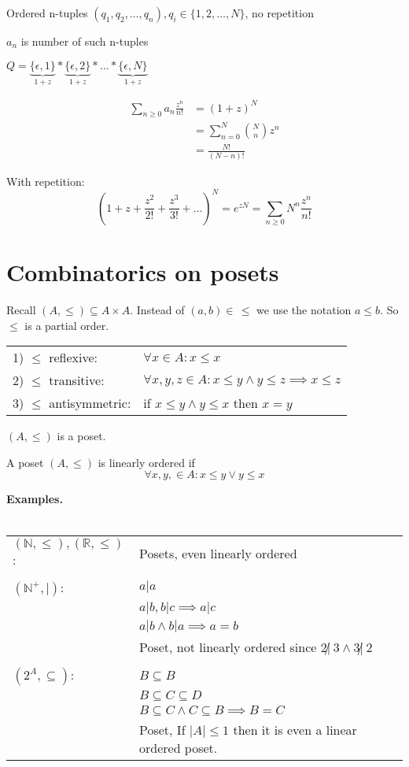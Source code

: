 Ordered n-tuples $(q_1,q_2, \ldots, q_n), q_i \in \{1,2, \ldots, N\}$, no repetition

$a_n$ is number of such n-tuples

$Q = \underbrace{\{\epsilon,1\}}_{1+z} *
     \underbrace{\{\epsilon,2\}}_{1+z} * \ldots *
     \underbrace{\{\epsilon,N\}}_{1+z} $

\begin{align*}
  \sum_{n\geq 0} a_n \frac{z^n}{n!} &=
    (1+z)^N \\
    &= \sum_{n=0} ^{N} {N \choose n} z^n \\
    &= \frac{N!}{(N-n)!}
\end{align*}

With repetition:
\[
  (1+z+ \frac{z^2}{2!} + \frac{z^3}{3!} + \ldots)^N
    = e^{zN} = \sum_{n\geq 0} N^n \frac{z^n}{n!}
\]

\section{Combinatorics on posets}

Recall $(A, \leq) \subseteq A \times A$.
Instead of $(a,b) \in \, \leq$ we use the notation $a \leq b$. So $\leq$ is a partial order.

\begin{tabular}{ll}
  1) $\leq$ reflexive: &
    $\forall x \in A: x \leq x$ \\
  2) $\leq$ transitive:  &
    $\forall x,y,z \in A: x \leq y \land y \leq z \implies x \leq z$ \\
  3) $\leq$ antisymmetric: &
    if $x \leq y \land y \leq x$ then $x = y$ \\
\end{tabular}

$(A,\leq)$ is a poset.

A poset $(A,\leq)$ is linearly ordered if
\[
  \forall x,y, \in A: x \leq y \lor y \leq x
\]

\textbf{Examples.}\\\\
\begin{tabular}{l l}
  $(\mathbb{N}, \leq), (\mathbb{R}, \leq)$: & Posets, even linearly ordered \\\\

  $(\mathbb{N}^{+}, |)$:
    & $a|a$ \\
    & $ a|b, b|c \implies a|c$\\
    & $ a|b \land b|a \implies a = b$\\
    & Poset, not linearly ordered since $2 \not|~ 3 \land 3 \not|~ 2$\\\\

  $(2^A, \subseteq)$:
    & $ B \subseteq B$\\
    & $ B \subseteq C \subseteq D$\\
    & $ B \subseteq C \land C \subseteq B \implies B = C$ \\
    & Poset, If $|A|\leq 1$ then it is even a linear ordered poset.
\end{tabular}

